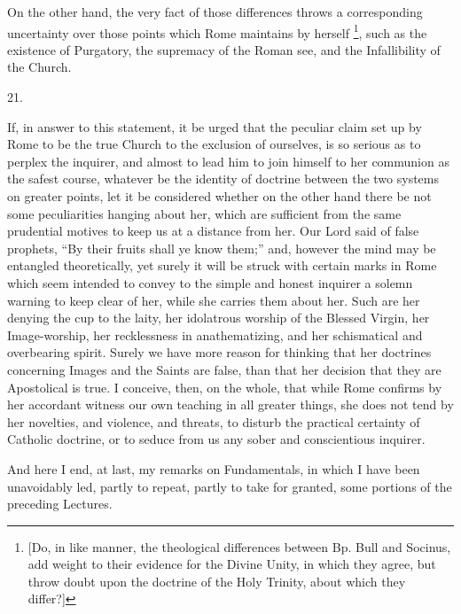 On the other hand, the very fact of those differences throws a
corresponding uncertainty over those points which Rome maintains by
herself \footnote{[Do, in like manner, the theological
differences between Bp. Bull and Socinus, add weight to their evidence
for the Divine Unity, in which they agree, but throw doubt upon the
doctrine of the Holy Trinity, about which they differ?]}, such as the
existence of Purgatory, the supremacy of the Roman see, and the
Infallibility of the Church.

21.

If, in answer to this statement, it be urged that the peculiar
claim set up by Rome to be the true Church to the exclusion of
ourselves, is so serious as to perplex the inquirer, and almost to
lead him to join himself to her communion as the safest course,
whatever be the identity of doctrine between the two systems on
greater points, let it be considered whether on the other hand there
be not some peculiarities hanging about her, which are sufficient from
the same prudential motives to keep us at a distance from her. Our
Lord said of false prophets, ``By their fruits shall ye know
them;'' and, however the mind may be entangled theoretically, yet
surely it will be struck with certain marks in Rome which seem
intended to convey to the simple and honest inquirer a solemn warning
to keep clear of her, while she carries them about her. Such are her
denying the cup to the laity, her idolatrous worship of the Blessed
Virgin, her Image-worship, her recklessness in anathematizing, and her
schismatical and overbearing spirit. Surely we have more reason for
thinking that her doctrines concerning Images and the Saints are
false, than that her decision that they are Apostolical is true. I
conceive, then, on the whole, that while Rome confirms by her
accordant witness our own teaching in all greater things, she does not
tend by her novelties, and violence, and threats, to disturb the
practical certainty of Catholic doctrine, or to seduce from us any
sober and conscientious inquirer.

And here I end, at last, my remarks on Fundamentals, in which I
have been unavoidably led, partly to repeat, partly to take for
granted, some portions of the preceding Lectures.


